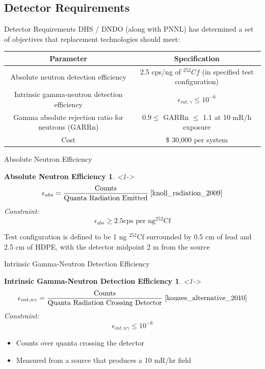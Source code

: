 \subsection{Detector Requirements}
\begin{frame}{Detector Requirements}
DHS / DNDO (along with PNNL) has determined a set of objectives that replacement technologies should meet:
\begin{table}
	\small
	\begin{tabular}{c c }
	Parameter & Specification \\
	\hline
	\hline
	Absolute neutron detection efficiency & 2.5 cps/ng of ${}^{252}Cf$ (in specified test configuration) \\
	Intrinsic gamma-neutron detection efficiency & $ \epsilon_{int,\gamma}\leq 10^{-6}$ \\
	Gamma absolute rejection ratio for neutrons (GARRn) & $ 0.9 \leq \text{ GARRn }\leq$ 1.1 at 10 mR/h exposure \\
	Cost &  \$ 30,000 per system \\
	\hline
	\end{tabular}
\end{table}
\end{frame}

\begin{frame}{Absolute Neutron Efficiency}
\newtheorem{thm1}{Absolute Neutron Efficiency}
\begin{thm1}<1->
$$\epsilon_{abs} = \frac{\text{Counts}}{\text{Quanta Radiation Emitted}} \; \protect \cite{knoll_radiation_2009} $$
Constraint:
$$\epsilon_{abs} \geq 2.5 \text{cps per ng} {}^{252}\text{Cf}$$
\end{thm1}
Test configuration is defined to be 1 ng ${}^{252}$Cf surrounded by 0.5 cm of lead and 2.5 cm of HDPE, with the detector midpoint 2 m from the source \cite{kouzes_alternative_2010}
\end{frame}


\begin{frame}{Intrinsic Gamma-Neutron Detection Efficiency}
\newtheorem{thm2}{Intrinsic Gamma-Neutron Detection Efficiency}
\begin{thm2}<1->
$$\epsilon_{int,n \gamma} = \frac{\text{Counts}}{\text{Quanta Radiation Crossing Detector}} \; \protect \cite{kouzes_alternative_2010} $$
Constraint:
$$ \epsilon_{int,n \gamma} \leq 10^{-6} $$
\end{thm2}
\begin{itemize}
	\item Counts over quanta crossing the detector
	\item Measured from a source that produces a 10 mR/hr field
\end{itemize}
\end{frame}


